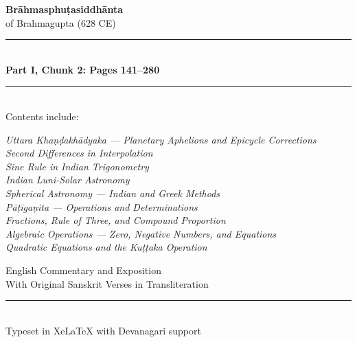 \documentclass[11pt,a4paper]{article}
\newcommand{\longline}{\noindent\rule{\textwidth}{0.4pt}}
\begin{document}
\begin{titlepage}
\centering
\vspace*{2cm}

{\Huge\bfseries\color{titlecolor} Brāhmasphuṭasiddhānta}\\[0.8cm]
{\LARGE\color{sectioncolor} of Brahmagupta (628 CE)}\\[2cm]

\longline\\[0.5cm]
{\Large\bfseries Part I, Chunk 2: Pages 141--280}\\[0.3cm]
\longline\\[2cm]

{\large Contents include:}\\[0.5cm]
\begin{minipage}{0.7\textwidth}
\centering
\textit{Uttara Khaṇḍakhādyaka --- Planetary Aphelions and Epicycle Corrections\\[0.2cm]
Second Differences in Interpolation\\[0.2cm]
Sine Rule in Indian Trigonometry\\[0.2cm]
Indian Luni-Solar Astronomy\\[0.2cm]
Spherical Astronomy --- Indian and Greek Methods\\[0.2cm]
Pāṭīgaṇita --- Operations and Determinations\\[0.2cm]
Fractions, Rule of Three, and Compound Proportion\\[0.2cm]
Algebraic Operations --- Zero, Negative Numbers, and Equations\\[0.2cm]
Quadratic Equations and the Kuṭṭaka Operation}
\end{minipage}

\vfill

{\large English Commentary and Exposition\\[0.3cm]
With Original Sanskrit Verses in Transliteration}\\[1cm]

\longline\\[0.3cm]
{\small Typeset in XeLaTeX with Devanagari support}

\end{titlepage}

\tableofcontents
\newpage

\end{document}
